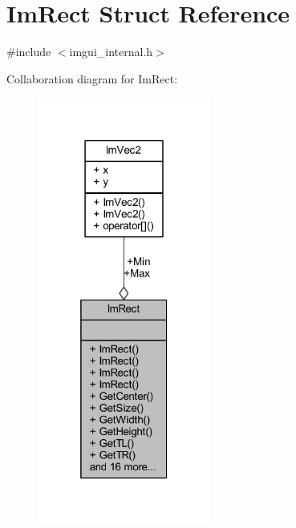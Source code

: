 \hypertarget{struct_im_rect}{}\section{Im\+Rect Struct Reference}
\label{struct_im_rect}


{\ttfamily \#include $<$imgui\+\_\+internal.\+h$>$}



Collaboration diagram for Im\+Rect\+:
\nopagebreak
\begin{figure}[H]
\begin{center}
\leavevmode
\includegraphics[width=160pt]{struct_im_rect__coll__graph}
\end{center}
\end{figure}
